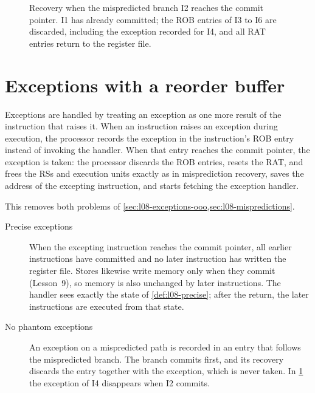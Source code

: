\documentclass[../main.tex]{subfiles}
\begin{document}
\begin{figure}[htbp]
  \centering
  
  \caption{Recovery when the mispredicted branch I2 reaches the commit pointer.
    I1 has already committed; the ROB entries of I3 to I6 are discarded,
    including the exception recorded for I4, and all RAT entries return to
    the register file.}
  \label{fig:l08-recovery}
\end{figure}

\section{Exceptions with a reorder buffer}
\label{sec:l08-rob-exceptions}

Exceptions are handled by treating an exception as one more result of the
instruction that raises it.  When
an instruction raises an exception during execution, the processor records
the exception in the instruction's ROB entry instead of invoking the handler.
When that entry reaches the commit pointer, the exception is taken: the
processor discards the ROB entries, resets the RAT, and frees the RSs and
execution units exactly as in misprediction recovery, saves the address of the
excepting instruction, and starts fetching the exception handler.

This removes both problems of
\cref{sec:l08-exceptions-ooo,sec:l08-mispredictions}.
\begin{description}
  \item[Precise exceptions] When the excepting instruction reaches the commit
    pointer, all earlier instructions have committed and no later instruction
    has written the register file.  Stores likewise write memory only when
    they commit (Lesson~9), so memory is also unchanged by later instructions.
    The handler sees exactly the state of \cref{def:l08-precise}; after the
    return, the later instructions are executed from that state.
  \item[No phantom exceptions] An exception on a mispredicted path is recorded
    in an entry that follows the mispredicted branch.  The branch commits
    first, and its recovery discards the entry together with the exception,
    which is never taken.  In \cref{fig:l08-recovery} the exception of I4
    disappears when I2 commits.
\end{description}
\end{document}
